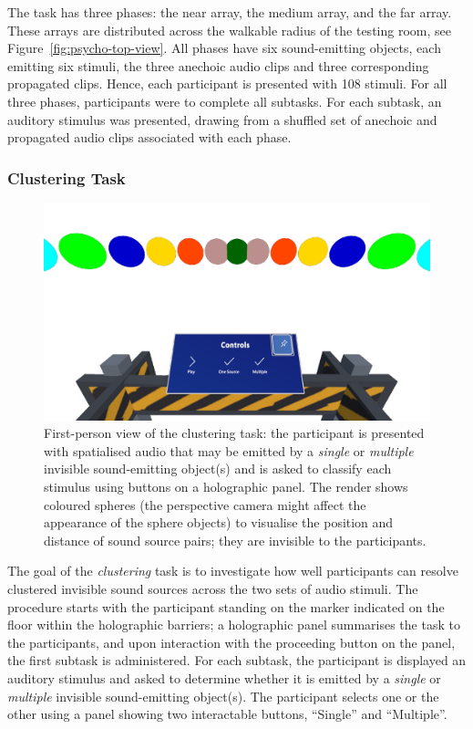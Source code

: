 The task has three phases: the near array, the medium array, and the far array. These arrays are distributed across the walkable radius of the testing room, see Figure~\ref{fig:psycho-top-view}. All phases have six sound-emitting objects, each emitting six stimuli, the three anechoic audio clips and three corresponding propagated clips. Hence, each participant is presented with 108 stimuli. For all three phases, participants were to complete all subtasks. For each subtask, an auditory stimulus was presented, drawing from a shuffled set of anechoic and propagated audio clips associated with each phase. \par

\subsubsection{Clustering Task}
\begin{figure}[htbp]
    \centering
    \includegraphics[width=1\columnwidth]{7_evaluation/images/clustering-fpv.png}
    \caption{First-person view of the clustering task: the participant is presented with spatialised audio that may be emitted by a \emph{single} or \emph{multiple} invisible sound-emitting object(s) and is asked to classify each stimulus using buttons on a holographic panel. The render shows coloured spheres (the perspective camera might affect the appearance of the sphere objects) to visualise the position and distance of sound source pairs; they are invisible to the participants.}
    \label{fig:clustering-fpv}
\end{figure}
The goal of the \emph{clustering} task is to investigate how well participants can resolve clustered invisible sound sources across the two sets of audio stimuli. The procedure starts with the participant standing on the marker indicated on the floor within the holographic barriers; a holographic panel summarises the task to the participants, and upon interaction with the proceeding button on the panel, the first subtask is administered. For each subtask, the participant is displayed an auditory stimulus and asked to determine whether it is emitted by a \emph{single} or \emph{multiple} invisible sound-emitting object(s). The participant selects one or the other using a panel showing two interactable buttons, ``Single'' and ``Multiple''. \par
